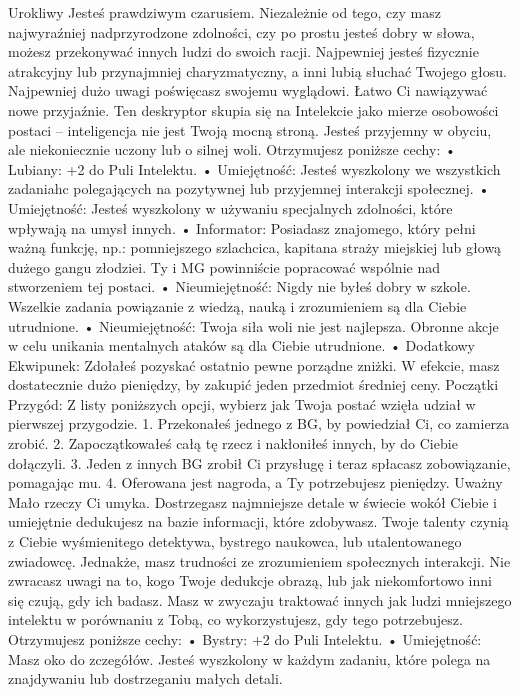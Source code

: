 Urokliwy
Jesteś prawdziwym czarusiem. Niezależnie od tego, czy masz najwyraźniej nadprzyrodzone zdolności, czy po prostu jesteś dobry w słowa, możesz przekonywać innych ludzi do swoich racji. Najpewniej jesteś fizycznie atrakcyjny lub przynajmniej charyzmatyczny, a inni lubią słuchać Twojego głosu. Najpewniej dużo uwagi poświęcasz swojemu wyglądowi. Łatwo Ci nawiązywać nowe przyjaźnie. Ten deskryptor skupia się na Intelekcie jako mierze osobowości postaci – inteligencja nie jest Twoją mocną stroną. Jesteś przyjemny w obyciu, ale niekoniecznie uczony lub o silnej woli. 
Otrzymujesz poniższe cechy:
    • Lubiany: +2 do Puli Intelektu.
    • Umiejętność: Jesteś wyszkolony we wszystkich zadaniahc polegających na pozytywnej lub przyjemnej interakcji społecznej.
    • Umiejętność: Jesteś wyszkolony w używaniu specjalnych zdolności, które wpływają na umysł innych.
    • Informator: Posiadasz znajomego, który pełni ważną funkcję, np.: pomniejszego szlachcica, kapitana straży miejskiej lub głową dużego gangu złodziei. Ty i MG powinniście popracować wspólnie nad stworzeniem tej postaci.
    • Nieumiejętność: Nigdy nie byłeś dobry w szkole. Wszelkie zadania powiązanie z wiedzą, nauką i zrozumieniem są dla Ciebie utrudnione.
    • Nieumiejętność: Twoja siła woli nie jest najlepsza. Obronne akcje w celu unikania mentalnych ataków są dla Ciebie utrudnione.
    • Dodatkowy Ekwipunek: Zdołałeś pozyskać ostatnio pewne porządne zniżki. W efekcie, masz dostatecznie dużo pieniędzy, by zakupić jeden przedmiot średniej ceny. 
Początki Przygód: Z listy poniższych opcji, wybierz jak Twoja postać wzięła udział w pierwszej przygodzie.
1. Przekonałeś jednego z BG, by powiedział Ci, co zamierza zrobić.
2. Zapoczątkowałeś całą tę rzecz i nakłoniłeś innych, by do Ciebie dołączyli.
3. Jeden z innych BG zrobił Ci przysługę i teraz spłacasz zobowiązanie, pomagając mu.
4. Oferowana jest nagroda, a Ty potrzebujesz pieniędzy.
Uważny
Mało rzeczy Ci umyka. Dostrzegasz najmniejsze detale w świecie wokół Ciebie i umiejętnie dedukujesz na bazie informacji, które zdobywasz. Twoje talenty czynią z Ciebie wyśmienitego detektywa, bystrego naukowca, lub utalentowanego zwiadowcę.
Jednakże, masz trudności ze zrozumieniem społecznych interakcji. Nie zwracasz uwagi na to, kogo Twoje dedukcje obrazą, lub jak niekomfortowo inni się czują, gdy ich badasz. Masz w zwyczaju traktować innych jak ludzi mniejszego intelektu w porównaniu z Tobą, co wykorzystujesz, gdy tego potrzebujesz.
Otrzymujesz poniższe cechy:
    • Bystry: +2 do Puli Intelektu.
    • Umiejętność: Masz oko do zczegółów. Jesteś wyszkolony w każdym zadaniu, które polega na znajdywaniu lub dostrzeganiu małych detali.
